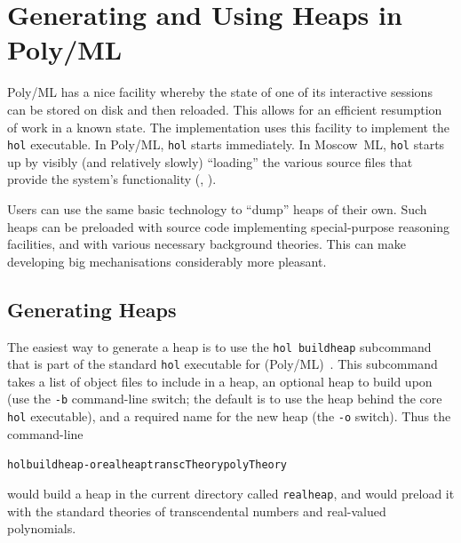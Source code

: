 

\section{Generating and Using Heaps in Poly/ML \HOL{}}
\label{sec:polyml-heaps}

Poly/ML has a nice facility whereby the state of one of its interactive sessions can be stored on disk and then reloaded.
This allows for an efficient resumption of work in a known state.
The \HOL{} implementation uses this facility to implement the \texttt{hol} executable.
In Poly/ML, \texttt{hol} starts immediately.
In Moscow~ML, \texttt{hol} starts up by visibly (and relatively slowly) ``loading'' the various source files that provide the system's functionality (\eg, ).

Users can use the same basic technology to ``dump'' heaps of their own.
Such heaps can be preloaded with source code implementing special-purpose reasoning facilities, and with various necessary background theories.
This can make developing big mechanisations considerably more pleasant.

\subsection{Generating \HOL{} Heaps}

The easiest way to generate a \HOL{} heap is to use the \texttt{hol buildheap} subcommand that is part of the standard \texttt{hol} executable for (Poly/ML)~\HOL.
This subcommand takes a list of object files to include in a heap, an optional heap to build upon (use the \texttt{-b} command-line switch; the default is to use the heap behind the core \texttt{hol} executable), and a required name for the new heap (the \texttt{-o} switch).
Thus the command-line
\begin{alltt}
   hol buildheap -o realheap transcTheory polyTheory
\end{alltt}
would build a heap in the current directory called \texttt{realheap}, and would preload it with the standard theories of transcendental numbers and real-valued polynomials.

